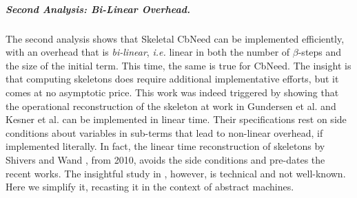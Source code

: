 \documentclass[10pt,a4paper]{article}
\theoremstyle{remark}
\newcommand{\ie}{{\em i.e.}\xspace}
\newcommand{\cbneed}{CbNeed\xspace}
\begin{document}
\subparagraph{Second Analysis: Bi-Linear Overhead.} The second analysis  shows that Skeletal \cbneed can be implemented efficiently, with an overhead that is \emph{bi-linear}, \ie linear in both the number of $\beta$-steps and the size of the initial term. This time, the same is true for \cbneed. The insight is that computing  skeletons  does require additional implementative efforts, but it comes at no asymptotic price.
This work was indeed triggered by showing that the operational reconstruction of the skeleton at work in Gundersen et al. \cite{DBLP:conf/lics/GundersenHP13} and Kesner et al. \cite{DBLP:journals/lmcs/KesnerPV24} can be implemented in linear time. Their specifications rest on side conditions about variables in sub-terms that lead to non-linear overhead, if implemented literally. In fact, the linear time reconstruction of skeletons by Shivers and Wand \cite{DBLP:journals/fuin/ShiversW10}, from 2010, avoids the side conditions  and pre-dates the recent works. The insightful study in \cite{DBLP:journals/fuin/ShiversW10}, however, is technical and not well-known. Here we simplify it, recasting it in the context of abstract machines.
\end{document}

